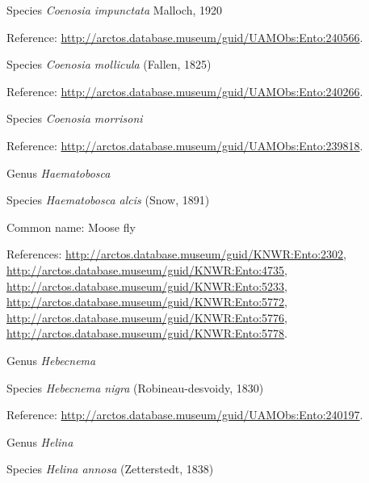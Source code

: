 \documentclass[9pt, article]{memoir}
\begin{document}
\begin{multicols}{2}
\vspace{6pt}\noindent\hspace{36pt}Species \textit{Coenosia impunctata} Malloch, 1920


Reference: 
\url{http://arctos.database.museum/guid/UAMObs:Ento:240566}.

\vspace{6pt}\noindent\hspace{36pt}Species \textit{Coenosia mollicula} (Fallen, 1825)


Reference: 
\url{http://arctos.database.museum/guid/UAMObs:Ento:240266}.

\vspace{6pt}\noindent\hspace{36pt}Species \textit{Coenosia morrisoni}


Reference: 
\url{http://arctos.database.museum/guid/UAMObs:Ento:239818}.

\vspace{6pt}\noindent\hspace{30pt}Genus \textit{Haematobosca}


\vspace{6pt}\noindent\hspace{36pt}Species \textit{Haematobosca alcis} (Snow, 1891)


Common name: Moose fly

References: 
\url{http://arctos.database.museum/guid/KNWR:Ento:2302}, 
\url{http://arctos.database.museum/guid/KNWR:Ento:4735}, 
\url{http://arctos.database.museum/guid/KNWR:Ento:5233}, 
\url{http://arctos.database.museum/guid/KNWR:Ento:5772}, 
\url{http://arctos.database.museum/guid/KNWR:Ento:5776}, 
\url{http://arctos.database.museum/guid/KNWR:Ento:5778}.

\vspace{6pt}\noindent\hspace{30pt}Genus \textit{Hebecnema}


\vspace{6pt}\noindent\hspace{36pt}Species \textit{Hebecnema nigra} (Robineau-desvoidy, 1830)


Reference: 
\url{http://arctos.database.museum/guid/UAMObs:Ento:240197}.

\vspace{6pt}\noindent\hspace{30pt}Genus \textit{Helina}


\vspace{6pt}\noindent\hspace{36pt}Species \textit{Helina annosa} (Zetterstedt, 1838)



\end{multicols}
\end{document}
